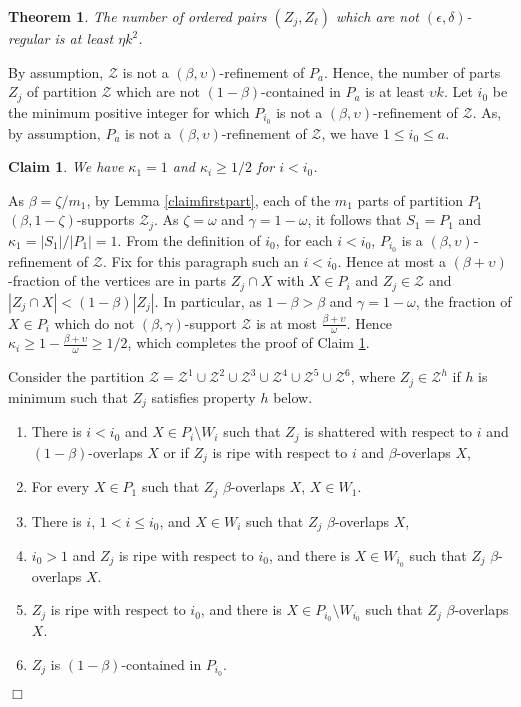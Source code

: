 \documentclass[11pt]{article}
\newtheorem{theorem}{Theorem}[section]
\newtheorem{claim}{Claim}[section]
\newenvironment{proof}
      {\medskip\noindent{\bf Proof:}\hspace{1mm}}
      {\hfill$\Box$\medskip}
\begin{document}
\begin{theorem}\label{mainagain}
The number of ordered pairs $(Z_j,Z_{\ell})$ which are not
$(\epsilon,\delta)$-regular is at least  $\eta k^2$.
\end{theorem}
\begin{proof}
By assumption, $\mathcal{Z}$ is not a $(\beta,\upsilon)$-refinement of $P_a$.
Hence, the number of parts $Z_j$ of partition $\mathcal{Z}$ which are not
$(1-\beta)$-contained in $P_a$ is at least
$\upsilon k$. Let $i_0$ be the minimum positive integer for which $P_{i_0}$ is
not a $(\beta,\upsilon)$-refinement of $\mathcal{Z}$. As, by assumption, $P_a$
is not a $(\beta,\upsilon)$-refinement of $\mathcal{Z}$, we have $1 \leq i_0
\leq a$.

\begin{claim}\label{claimforthm1}
We have $\kappa_1=1$ and $\kappa_{i} \geq 1/2$ for $i<i_0$.
\end{claim}
As $\beta=\zeta/m_1$, by Lemma \ref{claimfirstpart}, each of the $m_1$ parts of
partition $P_1$ $(\beta,1-\zeta)$-supports $\mathcal{Z}_j$. As $\zeta=\omega$
and $\gamma=1-\omega$, it follows that   $S_1=P_1$ and
$\kappa_1=|S_1|/|P_1|=1$. From the definition of $i_0$, for each $i<i_0$,
$P_{i_0}$ is a $(\beta,\upsilon)$-refinement of $\mathcal{Z}$. Fix for this
paragraph such an $i<i_0$. Hence at most a $(\beta+\upsilon)$-fraction of the
vertices are in parts $Z_j \cap X$ with $X \in P_i$ and $Z_j \in \mathcal{Z}$
and $|Z_j \cap X|<(1-\beta)|Z_j|$. In particular, as $1-\beta>\beta$ and
$\gamma=1-\omega$, the fraction of $X \in P_i$ which do not
$(\beta,\gamma)$-support $\mathcal{Z}$ is at most
$\frac{\beta+\upsilon}{\omega}$. Hence $\kappa_i \geq
1-\frac{\beta+\upsilon}{\omega} \geq 1/2$, which completes the proof of Claim
\ref{claimforthm1}.

Consider the partition $\mathcal{Z}=\mathcal{Z}^1 \cup \mathcal{Z}^2 \cup
\mathcal{Z}^3 \cup \mathcal{Z}^4 \cup \mathcal{Z}^5 \cup \mathcal{Z}^6$, where
$Z_j \in \mathcal{Z}^h$ if $h$ is minimum such that $Z_j$ satisfies property
$h$ below.
\begin{enumerate}
\item There is $i<i_0$ and $X \in P_i \setminus W_i$ such that $Z_j$
is shattered with respect to $i$ and $(1-\beta)$-overlaps $X$ or if $Z_j$ is
ripe with respect to $i$ and $\beta$-overlaps $X$,
\item For every $X \in P_1$ such that $Z_j$ $\beta$-overlaps $X$, $X \in W_1$.
\item There is $i$, $1 < i \leq i_0$, and $X \in W_i$ such that $Z_j$
$\beta$-overlaps $X$,
\item $i_0>1$ and $Z_j$ is ripe with respect to $i_0$, and there is $X \in
W_{i_0}$ such that $Z_j$ $\beta$-overlaps $X$.
\item $Z_j$ is ripe with respect to $i_0$, and there is $X \in P_{i_0}
\setminus W_{i_0}$ such that $Z_j$ $\beta$-overlaps $X$.
\item $Z_j$ is $(1-\beta)$-contained in $P_{i_0}$.
\end{enumerate}


\end{proof}
\end{document}
